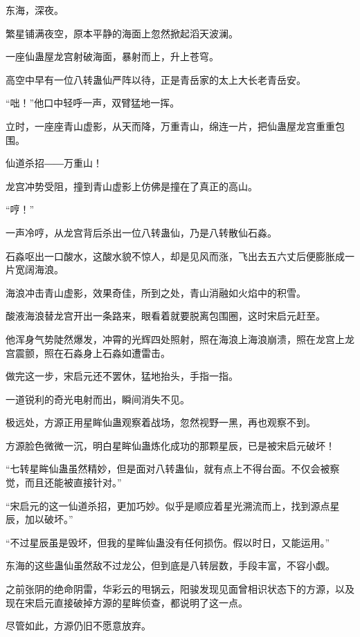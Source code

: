 
\begin{this_body}

东海，深夜。

繁星铺满夜空，原本平静的海面上忽然掀起滔天波澜。

一座仙蛊屋龙宫射破海面，暴射而上，升上苍穹。

高空中早有一位八转蛊仙严阵以待，正是青岳家的太上大长老青岳安。

“咄！”他口中轻呼一声，双臂猛地一挥。

立时，一座座青山虚影，从天而降，万重青山，绵连一片，把仙蛊屋龙宫重重包围。

仙道杀招――万重山！

龙宫冲势受阻，撞到青山虚影上仿佛是撞在了真正的高山。

“哼！”

一声冷哼，从龙宫背后杀出一位八转蛊仙，乃是八转散仙石淼。

石淼呕出一口酸水，这酸水貌不惊人，却是见风而涨，飞出去五六丈后便膨胀成一片宽阔海浪。

海浪冲击青山虚影，效果奇佳，所到之处，青山消融如火焰中的积雪。

酸液海浪替龙宫开出一条路来，眼看着就要脱离包围圈，这时宋启元赶至。

他浑身气势陡然爆发，冲霄的光辉四处照射，照在海浪上海浪崩溃，照在龙宫上龙宫震颤，照在石淼身上石淼如遭雷击。

做完这一步，宋启元还不罢休，猛地抬头，手指一指。

一道锐利的奇光电射而出，瞬间消失不见。

极远处，方源正用星眸仙蛊观察着战场，忽然视野一黑，再也观察不到。

方源脸色微微一沉，明白星眸仙蛊炼化成功的那颗星辰，已是被宋启元破坏！

“七转星眸仙蛊虽然精妙，但是面对八转蛊仙，就有点上不得台面。不仅会被察觉，而且还能被直接针对。”

“宋启元的这一仙道杀招，更加巧妙。似乎是顺应着星光溯流而上，找到源点星辰，加以破坏。”

“不过星辰虽是毁坏，但我的星眸仙蛊没有任何损伤。假以时日，又能运用。”

东海的这些蛊仙虽然敌不过龙公，但到底是八转层数，手段丰富，不容小觑。

之前张阴的绝命阴雷，华彩云的甩锅云，阳骏发现见面曾相识状态下的方源，以及现在宋启元直接破掉方源的星眸侦查，都说明了这一点。

尽管如此，方源仍旧不愿意放弃。


\end{this_body}
